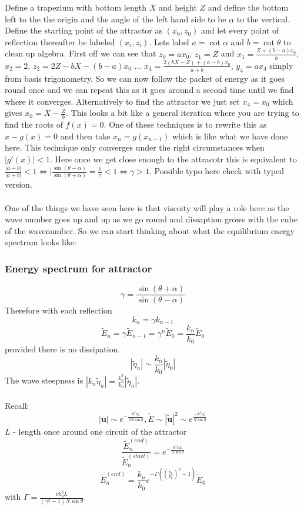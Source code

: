 \documentclass{article}
\begin{document}
Define a trapezium with bottom length $X$ and height $Z$ and define the bottom left to the the origin and the angle of the left hand side to be $\alpha$ to the vertical. Define the starting point of the attractor as $(x_0, z_0)$ and let every point of reflection thereafter be labeled $(x_i, z_i)$. Lets label $a = \cot \alpha$ and $b = \cot \theta$ to clean up algebra. First off we can see that $z_0 = a x_0$, $z_1 = Z$ and $x_1 = \frac{Z + (b-a)x_0}{b}$, $x_2 =2$, $z_2 = 2 Z - bX -(b-a) x_0$ ... $x_4 = \frac{2(bX - Z) + (a-b) x_0}{a+b}$, $y_4 = a x_4$ simply from basis trigonometry. So we can now follow the packet of energy as it goes round once and we can repeat this as it goes around a second time until we find where it converges. Alternatively to find the attractor we just set $x_4 = x_0$ which gives $x_0 =  X - \frac{Z}{b}$. This looks a bit like a general iteration where you are trying to find the roots of $f(x) = 0$. One of these techniques is to rewrite this as $x- g(x) = 0$ and then take $x_n = g(x_{n-1})$ which is like what we have done here. This technique only converges under the right circumstances when $|g'(x)| <1$. Here once we get close enough to the attracotr this is equivalent to $\frac{| a-b|}{|a+b|}<1 \iff |\frac{ \sin(\theta - \alpha)}{\sin(\theta + \alpha)} = \frac{1}{\gamma} <1 \iff \gamma > 1$. Possible typo here check with typed version.\\\\
One of the things we have seen here is that viscoity will play a role here as the wave number goes up and up as we go round and dissaption grows with the cube of the wavenumber. So we can start thinking about what the equilibrium energy spectrum looks like:
\subsubsection{Energy spectrum for attractor}
$$
\gamma = \frac{\sin (\theta + \alpha)}{\sin(\theta - \alpha)}
$$
Therefore with each reflection 
$$
k_n = \gamma k_{n-1}
$$
$$
\tilde E_n = \gamma \tilde E_{n-1} = \gamma^n \tilde E_0 = \frac{k_n}{k_0} \tilde E_0
$$
provided there is no dissipation.
$$
|\tilde \eta_n|\sim \frac{k_n}{k_0} |\tilde \eta_0|
$$
The wave steepness is $|k_n \tilde \eta_n| = \frac{k_n^2}{k_0} |\tilde \eta_n|$.\\\\
Recall:
$$
|\bm u| \sim e^{- \frac{k^2 \nu \zeta}{2 N \sin \theta}}, \tilde{E} \sim |\tilde{\bm u}|^2 \sim e^{\frac{- k^3 \nu \zeta }{N \sin \theta}}
$$
$L$ - length once around one circuit of the attractor\\
$$
\frac{\tilde E_n^{(end)}}{\tilde E_n^{(start)}} = e^{- \frac{k^3 \nu L}{N\sin \theta}}
$$
$$
\tilde E_n^{(end)} = \frac{k_n}{k_0} e^{- \Gamma ( ( \frac{k_n}{k_0})^3 - 1) }\tilde E_0
$$
with $\Gamma = \frac{\nu k_0^3 L}{(\gamma^3 - 1) N \sin \theta}$.
\end{document}
